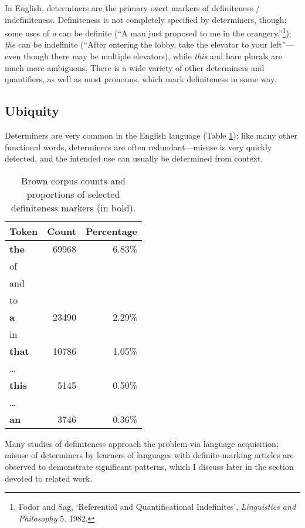 \documentclass[11pt]{article}\usepackage{graphicx, color}
\begin{document}
In English, determiners are the primary overt markers of definiteness / indefiniteness.
Definiteness is not completely specified by determiners, though; some uses of \emph{a} can be definite (``A man just proposed to me in the orangery.''\footnote{Fodor and Sag, `Referential and Quantificational Indefinites', \emph{Linguistics and Philosophy} 5. 1982.}); \emph{the} can be indefinite (``After entering the lobby, take the elevator to your left''---even though there may be multiple elevators), while \emph{this} and bare plurals are much more ambiguous. There is a wide variety of other determiners and quantifiers, as well as most pronouns, which mark definiteness in some way.

\subsection{Ubiquity}
Determiners are very common in the English language (Table \ref{tab:browncounts}); like many other functional words, determiners are often redundant---misuse is very quickly detected, and the intended use can usually be determined from context.
\begin{table}
  \centering
  \begin{tabular}{lrr}
    Token & Count & Percentage\\
    \toprule
    \textbf{the} & 69968 & 6.83\% \\
    of & &\\%
    and & &\\%
    to & &\\%
    \textbf{a} & 23490 & 2.29\% \\
    in & &\\%
    \textbf{that} & 10786 & 1.05\% \\
    \dots &       &          \\
    \textbf{this} & 5145 & 0.50\% \\
    \dots &       &          \\
    \textbf{an} & 3746 & 0.36\% \\
  \end{tabular}
  \caption{Brown corpus counts and proportions of selected definiteness markers (in bold).}
  \label{tab:browncounts}
\end{table}
Many studies of definiteness approach the problem via language acquisition; misuse of determiners by learners of languages with definite-marking articles are observed to demonstrate significant patterns, which I discuss later in the section devoted to related work.
\end{document}

